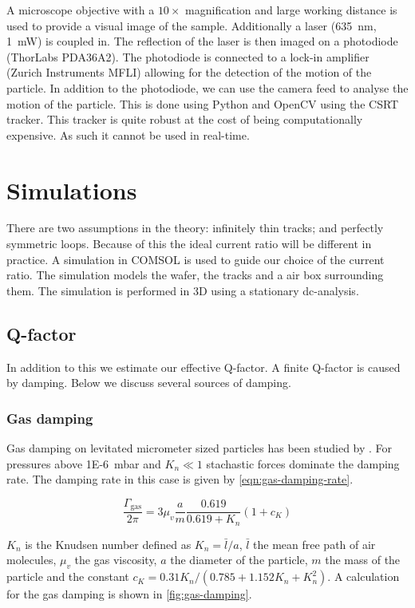 A microscope objective with a $10\times$ magnification and large working distance is used to provide a visual image of the sample. Additionally a laser (\qty{635}{\nm}, \qty{1}{\milli\watt}) is coupled in. The reflection of the laser is then imaged on a photodiode (ThorLabs PDA36A2). The photodiode is connected to a lock-in amplifier (Zurich Instruments MFLI) allowing for the detection of the motion of the particle. In addition to the photodiode, we can use the camera feed to analyse the motion of the particle. This is done using Python and OpenCV using the CSRT tracker. This tracker is quite robust at the cost of being computationally expensive. As such it cannot be used in real-time.

\section{Simulations}
There are two assumptions in the theory: infinitely thin tracks; and perfectly symmetric loops. Because of this the ideal current ratio will be different in practice. A simulation in COMSOL is used to guide our choice of the current ratio. The simulation models the  wafer, the  tracks and a air box surrounding them. The simulation is performed in 3D using a stationary dc-analysis.

\subsection{Q-factor}
\label{subsec:q-factor}
In addition to this we estimate our effective Q-factor. A finite Q-factor is caused by damping. Below we discuss several sources of damping.

\subsubsection{Gas damping}
Gas damping on levitated micrometer sized particles has been studied by \citeauthor{millen}. For pressures above \qty{1E-6}{\milli\bar} and $K_n \ll 1$ stachastic forces dominate the damping rate. The damping rate in this case is given by \autoref{eqn:gas-damping-rate}.

\begin{equation}
    \frac{\Gamma_{\text {gas}}}{2 \pi}=3 \mu_v \frac{a}{m} \frac{0.619}{0.619+K_n} \left( 1+c_K \right)
    \label{eqn:gas-damping-rate}
\end{equation}

$K_n$ is the Knudsen number defined as $K_n = \bar{l}/a$, $\bar{l}$ the mean free path of air molecules, $\mu_v$ the gas viscosity, $a$ the diameter of the particle, $m$ the mass of the particle and the constant $c_K = 0.31 K_n / \left(0.785 + 1.152 K_n + K_n^2 \right)$. A calculation for the gas damping is shown in \autoref{fig:gas-damping}.

